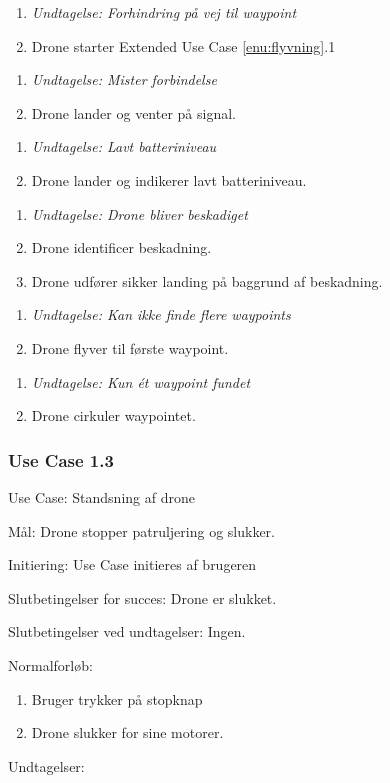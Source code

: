 \documentclass[Main]{subfiles}
\begin{document}
	
	\begin{enumerate}
	\item[] \textit{Undtagelse: Forhindring på vej til waypoint}
	\item Drone starter Extended Use Case \ref{enu:flyvning}.1
	\end{enumerate}
	
	
	\begin{enumerate}
	\item[] \textit{Undtagelse: Mister forbindelse}
	\item Drone lander og venter på signal.
	\end{enumerate}


	\begin{enumerate}
	\item[] \textit{Undtagelse: Lavt batteriniveau}
	\item Drone lander og indikerer lavt batteriniveau.
	\end{enumerate}

	
	\begin{enumerate}
	\item[] \textit{Undtagelse: Drone bliver beskadiget}
	\item Drone identificer beskadning.
	\item Drone udfører sikker landing på baggrund af beskadning.
	\end{enumerate}	
	
	
	\begin{enumerate}
	\item[] \textit{Undtagelse: 	Kan ikke finde flere waypoints}
	\item Drone flyver til første waypoint.
	\end{enumerate}	
	
	\begin{enumerate}
	\item[] \textit{Undtagelse: 	Kun ét waypoint fundet}
	\item Drone cirkuler waypointet.
	\end{enumerate}	
	
	
	
\subsubsection{Use Case 1.3}

Use Case: Standsning af drone

Mål: Drone stopper patruljering og slukker.

Initiering: Use Case initieres af brugeren

Slutbetingelser for succes: 
Drone er slukket.

Slutbetingelser ved undtagelser: 
Ingen.

Normalforløb: 
	
	\begin{enumerate}
	\item Bruger trykker på stopknap
	\item Drone slukker for sine motorer.
	\end{enumerate}

Undtagelser:
	
	
\end{document}
